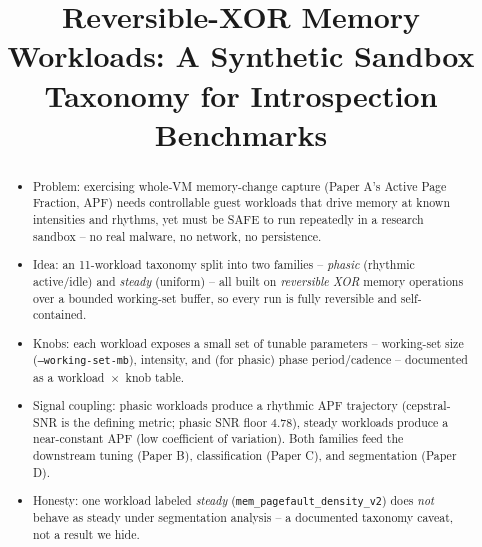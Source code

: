 \documentclass[conference]{IEEEtran}
\title{Reversible-XOR Memory Workloads: A Synthetic Sandbox\\
Taxonomy for Introspection Benchmarks}
\author{\IEEEauthorblockN{TODO Author list}
\IEEEauthorblockA{TODO Affiliation\\
\texttt{TODO@email}}}
\begin{document}
\maketitle

\begin{abstract}
\begin{itemize}
  \item Problem: exercising whole-VM memory-change capture (Paper A's Active
        Page Fraction, APF) needs controllable guest workloads that drive
        memory at known intensities and rhythms, yet must be SAFE to run
        repeatedly in a research sandbox -- no real malware, no network, no
        persistence.
  \item Idea: an 11-workload taxonomy split into two families -- \emph{phasic}
        (rhythmic active/idle) and \emph{steady} (uniform) -- all built on
        \emph{reversible XOR} memory operations over a bounded working-set
        buffer, so every run is fully reversible and self-contained.
  \item Knobs: each workload exposes a small set of tunable parameters --
        working-set size (\texttt{--working-set-mb}), intensity, and (for
        phasic) phase period/cadence -- documented as a workload~$\times$~knob
        table.
  \item Signal coupling: phasic workloads produce a rhythmic APF trajectory
        (cepstral-SNR is the defining metric; phasic SNR floor \num{4.78}),
        steady workloads produce a near-constant APF (low coefficient of
        variation). Both families feed the downstream tuning (Paper B),
        classification (Paper C), and segmentation (Paper D).
  \item Honesty: one workload labeled \emph{steady}
        (\texttt{mem\_pagefault\_density\_v2}) does \emph{not} behave as steady
        under segmentation analysis -- a documented taxonomy caveat, not a
        result we hide.
\end{itemize}
\end{abstract}

\end{document}
